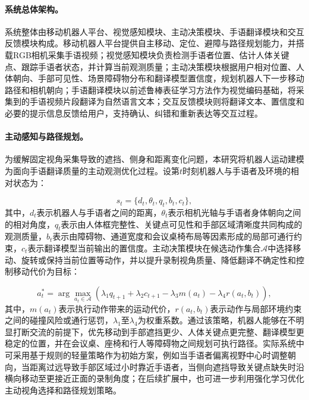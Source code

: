 \paragraph{系统总体架构。}

系统整体由移动机器人平台、视觉感知模块、主动决策模块、手语翻译模块和交互反馈模块构成。移动机器人平台提供自主移动、定位、避障与路径规划能力，并搭载RGB相机采集手语视频；视觉感知模块负责检测手语者位置、估计人体关键点、跟踪手语者状态，并计算当前观测质量；主动决策模块根据用户相对位置、人体朝向、手部可见性、场景障碍物分布和翻译模型置信度，规划机器人下一步移动路径和相机朝向；手语翻译模块以前述鲁棒表征学习方法作为视觉编码基础，将采集到的手语视频片段翻译为自然语言文本；交互反馈模块则将翻译文本、置信度和必要的提示信息反馈给用户，支持确认、纠错和重新表达等交互过程。

\paragraph{主动感知与路径规划。}

为缓解固定视角采集导致的遮挡、侧身和距离变化问题，本研究将机器人运动建模为面向手语翻译质量的主动观测优化过程。设第$t$时刻机器人与手语者及环境的相对状态为：

\begin{equation}
    s_t = \{d_t, \theta_t, q_t, b_t, c_t\},
    \label{eq:robot_state}
\end{equation}
其中，$d_t$表示机器人与手语者之间的距离，$\theta_t$表示相机光轴与手语者身体朝向之间的相对角度，$q_t$表示由人体框完整性、关键点可见性和手部区域清晰度共同构成的观测质量，$b_t$表示由障碍物、通道宽度和会议桌椅布局等因素形成的局部可通行约束，$c_t$表示翻译模型当前输出的置信度。主动决策模块在候选动作集合$\mathcal{A}$中选择移动、旋转或保持当前位置等动作，并以提升录制视角质量、降低翻译不确定性和控制移动代价为目标：

\begin{equation}
    a_t^{*}
    =
    \arg\max_{a_t\in\mathcal{A}}
    \left(
    \lambda_1 q_{t+1}
    +
    \lambda_2 c_{t+1}
    -
    \lambda_3 m(a_t)
    -
    \lambda_4 r(a_t, b_t)
    \right),
    \label{eq:robot_active_policy}
\end{equation}
其中，$m(a_t)$表示执行动作带来的运动代价，$r(a_t,b_t)$表示动作与局部环境约束之间的碰撞风险或通行惩罚，$\lambda_1$至$\lambda_4$为权重系数。通过该策略，机器人能够在不明显打断交流的前提下，优先移动到手部遮挡更少、人体关键点更完整、翻译模型更稳定的位置，并在会议桌、座椅和行人等障碍物之间规划可执行路径。实际系统中可采用基于规则的轻量策略作为初始方案，例如当手语者偏离视野中心时调整朝向，当距离过远导致手部区域过小时靠近手语者，当侧向遮挡导致关键点缺失时沿横向移动至更接近正面的录制角度；在后续扩展中，也可进一步利用强化学习优化主动视角选择和路径规划策略。

